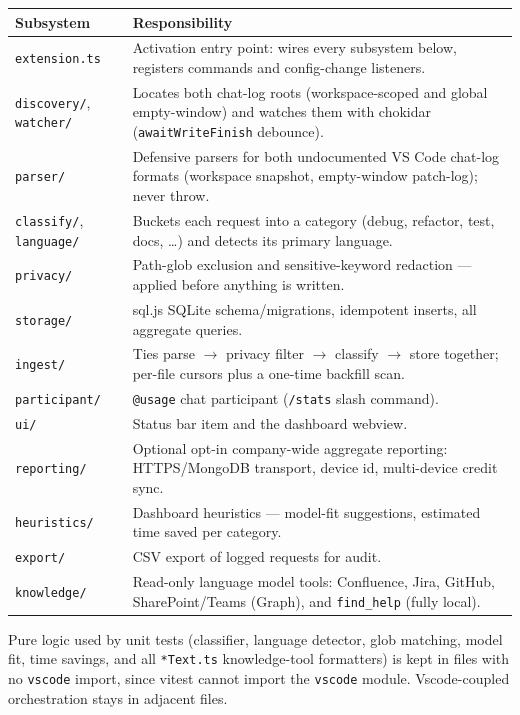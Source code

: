 \documentclass[11pt,a4paper]{article}
\newcommand{\code}[1]{\texttt{\color{lloydsblue!80!black}#1}}
\begin{document}
\begin{longtable}{@{}p{4.2cm}p{10.8cm}@{}}
\toprule
\textbf{Subsystem} & \textbf{Responsibility} \\
\midrule
\endhead
\code{extension.ts} & Activation entry point: wires every subsystem below, registers commands and config-change listeners. \\
\code{discovery/}, \code{watcher/} & Locates both chat-log roots (workspace-scoped and global empty-window) and watches them with chokidar (\code{awaitWriteFinish} debounce). \\
\code{parser/} & Defensive parsers for both undocumented VS Code chat-log formats (workspace snapshot, empty-window patch-log); never throw. \\
\code{classify/}, \code{language/} & Buckets each request into a category (debug, refactor, test, docs, \ldots) and detects its primary language. \\
\code{privacy/} & Path-glob exclusion and sensitive-keyword redaction --- applied before anything is written. \\
\code{storage/} & sql.js SQLite schema/migrations, idempotent inserts, all aggregate queries. \\
\code{ingest/} & Ties parse $\rightarrow$ privacy filter $\rightarrow$ classify $\rightarrow$ store together; per-file cursors plus a one-time backfill scan. \\
\code{participant/} & \code{@usage} chat participant (\code{/stats} slash command). \\
\code{ui/} & Status bar item and the dashboard webview. \\
\code{reporting/} & Optional opt-in company-wide aggregate reporting: HTTPS/MongoDB transport, device id, multi-device credit sync. \\
\code{heuristics/} & Dashboard heuristics --- model-fit suggestions, estimated time saved per category. \\
\code{export/} & CSV export of logged requests for audit. \\
\code{knowledge/} & Read-only language model tools: Confluence, Jira, GitHub, SharePoint/Teams (Graph), and \code{find\_help} (fully local). \\
\bottomrule
\end{longtable}

\begin{note}
Pure logic used by unit tests (classifier, language detector, glob matching,
model fit, time savings, and all \code{*Text.ts} knowledge-tool formatters)
is kept in files with no \code{vscode} import, since vitest cannot import
the \code{vscode} module. Vscode-coupled orchestration stays in adjacent
files.
\end{note}
\end{document}
